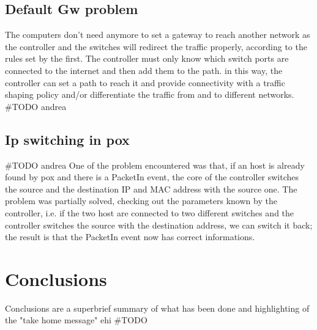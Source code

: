 \documentclass[conference,10pt]{IEEEtran}
\begin{document}
  \subsection{Default Gw problem}

  The computers don't need anymore to set a gateway to reach another network as the controller and the switches will redirect the traffic
  properly, according to the rules set by the first. The controller must only know which switch ports are connected to the
  internet and then add them to the path. in this way, the controller can set a path to reach it and provide connectivity with
  a traffic shaping policy and/or differentiate the traffic from and to different networks.
  \#TODO andrea

  \subsection{Ip switching in pox}

  \#TODO andrea
	One of the problem encountered was that, if an host is already found by pox and there is a PacketIn event, the core of the controller
	switches the source and the destination IP and MAC address with the source one. The problem was partially solved, checking out the
	parameters known by the controller, i.e. if the two host are connected to two different switches and the controller switches the source with the
	destination address, we can switch it back; the result is that the PacketIn event now has correct informations.

\section{Conclusions}\label{sec:conclusion}
Conclusions are a superbrief summary of what has been done and highlighting of the "take home message"
ehi
\#TODO
\end{document}
